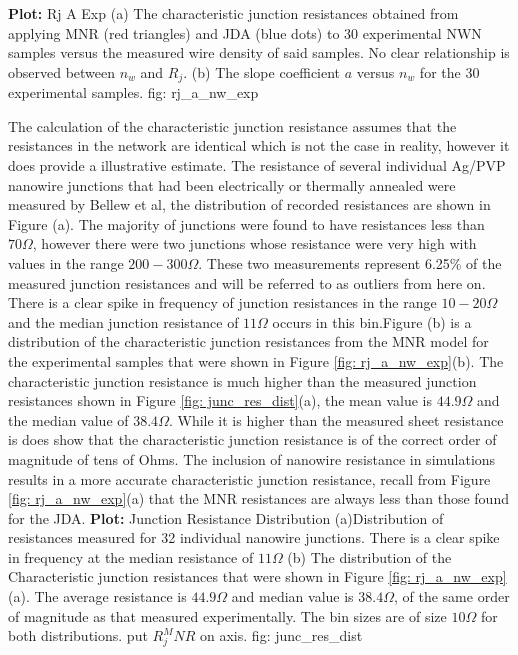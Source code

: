 {\textbf{Plot:} Rj A Exp}
{(a) The characteristic junction resistances obtained from applying MNR (red triangles) and JDA (blue dots) to 30 experimental NWN samples versus the measured wire density of said samples. No clear relationship is observed between $n_w$ and $R_j$. (b) The slope coefficient $a$ versus $n_w$ for the 30 experimental samples. }
{fig: rj_a_nw_exp}

The calculation of the characteristic junction resistance assumes that the resistances in the network are identical which is not the case in reality, however it does provide a illustrative estimate. The resistance of several individual Ag/PVP nanowire junctions that had been electrically or thermally annealed were measured by Bellew et al, the distribution of recorded resistances are shown in Figure \label{fig: junc_res_dist}(a). The majority of junctions were found to have resistances less than $70 \Omega$, however there were two junctions whose resistance were very high with values in the range $200 - 300 \Omega$. These two measurements represent 6.25\% of the measured junction resistances and will be referred to as outliers from here on. There is a clear spike in frequency of junction resistances in the range $10 - 20 \Omega$ and the median junction resistance of $11 \Omega$ occurs in this bin.Figure \label{fig: junc_res_dist}(b) is a distribution of the characteristic junction resistances from the MNR model for the experimental samples that were shown in Figure \ref{fig: rj_a_nw_exp}(b). The characteristic junction resistance is much higher than the measured junction resistances shown in Figure \ref{fig: junc_res_dist}(a), the mean value is $44.9\Omega$ and the median value of $38.4\Omega$. While it is higher than the measured sheet resistance is does show that the characteristic junction resistance is of the correct order of magnitude of tens of Ohms. The inclusion of nanowire resistance in simulations results in a more accurate characteristic junction resistance, recall from Figure \ref{fig: rj_a_nw_exp}(a) that the MNR resistances are always less than those found for the JDA. 
{\textbf{Plot:} Junction Resistance Distribution}
{(a)Distribution of resistances measured for 32 individual nanowire junctions. There is a clear spike in frequency at the median resistance of $11 \Omega$ (b) The distribution of the Characteristic junction resistances that were shown in Figure \ref{fig: rj_a_nw_exp}(a). The average resistance is $44.9\Omega$ and median value is $38.4\Omega$, of the same order of magnitude as that measured experimentally. The bin sizes are of size $10 \Omega$ for both distributions. put $R_j^MNR$ on axis.}
{fig: junc_res_dist}

